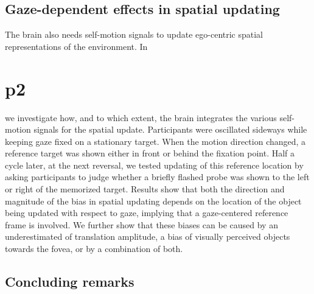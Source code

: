 \section{Gaze-dependent effects in spatial updating}
The brain also needs self-motion signals to update ego-centric spatial representations of the environment. In \chapter{p2} we investigate how, and to which extent, the brain integrates the various self-motion signals for the spatial update. Participants were oscillated sideways while keeping gaze fixed on a stationary target. When the motion direction changed, a reference target was shown either in front or behind the fixation point. Half a cycle later, at the next reversal, we tested updating of this reference location by asking participants to judge whether a briefly flashed probe was shown to the left or right of the memorized target. Results show that both the direction and magnitude of the bias in spatial updating depends on the location of the object being updated with respect to gaze, implying that a gaze-centered reference frame is involved. We further show that these biases can be caused by an underestimated of translation amplitude, a bias of visually perceived objects towards the fovea, or by a combination of both.

\section{Concluding remarks}

